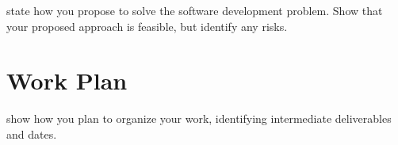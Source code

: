 \documentclass{interim}
\begin{document}
state how you propose to solve the software development problem. Show that your proposed approach is feasible, but identify any risks.

\section{Work Plan}

show how you plan to organize your work, identifying intermediate deliverables and dates.



\end{document}
